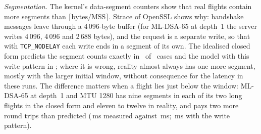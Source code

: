 \documentclass[preprint,12pt]{elsarticle}
\newcommand{\ms}{\,ms\xspace}
\begin{document}
\emph{Segmentation.} The kernel's data-segment counters show that real flights contain more segments than $\lceil\text{bytes}/\text{MSS}\rceil$. Strace of OpenSSL shows why: handshake messages leave through a 4\,096-byte buffer (for ML-DSA-65 at depth~1 the server writes 4\,096, 4\,096 and 2\,688 bytes), and the request is a separate write, so that with \texttt{TCP\_NODELAY} each write ends in a segment of its own. The idealised closed form predicts the segment counts exactly in \tbSegIdealExact\ of \tbSegTotal\ cases and the model with this write pattern in \tbSegExact; where it is wrong, reality almost always has one more segment, mostly with the larger initial window, without consequence for the latency in these runs. The difference matters when a flight lies just below the window: ML-DSA-65 at depth~1 and MTU 1280 has nine segments in each of its two long flights in the closed form and eleven to twelve in reality, and pays two more round trips than predicted (\tbSegMeas\ms measured against \tbSegIdealMs\ms; \tbSegStackMs\ms with the write pattern).
\end{document}

